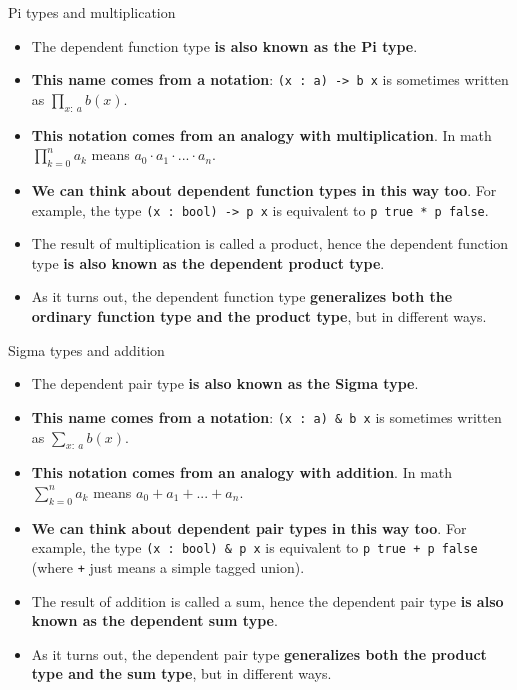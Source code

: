 \documentclass{beamer}
\newcommand{\m}[1]{\texttt{#1}}
\begin{document}
\begin{frame}{Pi types and multiplication}
\begin{itemize}
	\item The dependent function type \textbf{is also known as the Pi type}.
	\item \textbf{This name comes from a notation}: \m{(x :\ a) -> b x} is sometimes written as $\displaystyle \prod_{x :\ a} b(x)$.
	\item \textbf{This notation comes from an analogy with multiplication}. In math $\displaystyle \prod_{k = 0}^n a_k$ means $a_0 \cdot a_1 \cdot ... \cdot a_n$.
	\item \textbf{We can think about dependent function types in this way too}. For example, the type \m{(x :\ bool) -> p x} is equivalent to \m{p true * p false}.
	\item The result of multiplication is called a product, hence the dependent function type \textbf{is also known as the dependent product type}.
	\item As it turns out, the dependent function type \textbf{generalizes both the ordinary function type and the product type}, but in different ways.
\end{itemize}
\end{frame}

\begin{frame}{Sigma types and addition}
\begin{itemize}
	\item The dependent pair type \textbf{is also known as the Sigma type}.
	\item \textbf{This name comes from a notation}: \m{(x :\ a) \& b x} is sometimes written as $\displaystyle \sum_{x :\ a} b(x)$.
	\item \textbf{This notation comes from an analogy with addition}. In math $\displaystyle \sum_{k = 0}^n a_k$ means $a_0 + a_1 + ... + a_n$.
	\item \textbf{We can think about dependent pair types in this way too}. For example, the type \m{(x :\ bool) \& p x} is equivalent to \m{p true + p false} (where \m{+} just means a simple tagged union).
	\item The result of addition is called a sum, hence the dependent pair type \textbf{is also known as the dependent sum type}.
	\item As it turns out, the dependent pair type \textbf{generalizes both the product type and the sum type}, but in different ways.
\end{itemize}
\end{frame}
\end{document}
